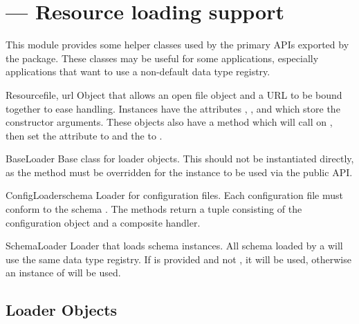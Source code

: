 \documentclass{howto}
\begin{document}
\section{ --- Resource loading support}


This module provides some helper classes used by the primary APIs
exported by the  package.  These classes may be useful
for some applications, especially applications that want to use a
non-default data type registry.

\begin{classdesc}{Resource}{file, url}
  Object that allows an open file object and a URL to be bound
  together to ease handling.  Instances have the attributes
  , , and  which store the
  constructor arguments.  These objects also have a 
  method which will call  on , then set the
   attribute to  and the  to
  .
\end{classdesc}

\begin{classdesc}{BaseLoader}{}
  Base class for loader objects.  This should not be instantiated
  directly, as the  method must be overridden
  for the instance to be used via the public API.
\end{classdesc}

\begin{classdesc}{ConfigLoader}{schema}
  Loader for configuration files.  Each configuration file must
  conform to the schema .  The  methods
  return a tuple consisting of the configuration object and a
  composite handler.
\end{classdesc}

\begin{classdesc}{SchemaLoader}{}
  Loader that loads schema instances.  All schema loaded by a
   will use the same data type registry.  If
   is provided and not , it will be used,
  otherwise an instance of  will be
  used.
\end{classdesc}


\subsection{Loader Objects}
\end{document}
